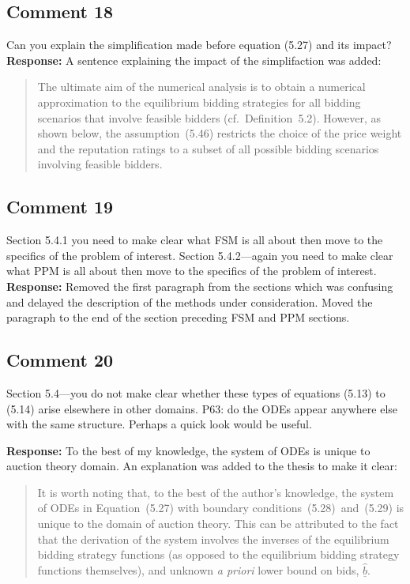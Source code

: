 \documentclass[10pt,a4paper,notitlepage]{article}
\numberwithin{equation}{section}
\begin{document}
\subsection{Comment 18}
Can you explain the simplification made before equation (5.27) and its impact?\\[-2ex]

\textbf{Response:}
A sentence explaining the impact of the simplifaction was added:
\begin{quote}
The ultimate aim of the numerical analysis is to obtain a numerical approximation to the equilibrium bidding strategies for all bidding scenarios that involve feasible bidders (cf.~Definition~5.2). However, as shown below, the assumption~(5.46) restricts the choice of the price weight and the reputation ratings to a subset of all possible bidding scenarios involving feasible bidders.
\end{quote}

\subsection{Comment 19}
Section 5.4.1 you need to make clear what FSM is all about then move to the specifics of the problem of interest. Section 5.4.2---again you need to make clear what PPM is all about then move to the specifics of the problem of interest.\\[-2ex]

\textbf{Response:}
Removed the first paragraph from the sections which was confusing and delayed the description of the methods under consideration. Moved the paragraph to the end of the section preceding FSM and PPM sections.

\subsection{Comment 20}
Section 5.4---you do not make clear whether these types of equations (5.13) to (5.14) arise elsewhere in other domains. P63: do the ODEs appear anywhere else with the same structure. Perhaps a quick look would be useful.

\textbf{Response:}
To the best of my knowledge, the system of ODEs is unique to auction theory domain. An explanation was added to the thesis to make it clear:
\begin{quote}
It is worth noting that, to the best of the author's knowledge, the system of ODEs in Equation~(5.27) with boundary conditions~(5.28)~and~(5.29) is unique to the domain of auction theory. This can be attributed to the fact that the derivation of the system involves the inverses of the equilibrium bidding strategy functions (as opposed to the equilibrium bidding strategy functions themselves), and unknown \emph{a priori} lower bound on bids, $\underline{\hat{b}}$.
\end{quote}
\end{document}
